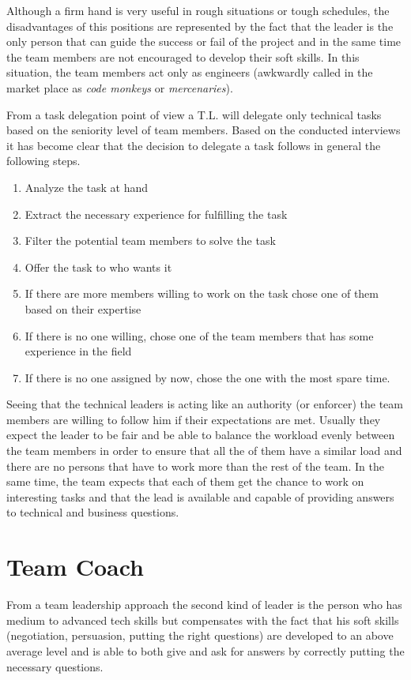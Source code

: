 Although a firm hand is very useful in rough situations or tough schedules, the disadvantages of this positions are represented by the fact that the leader is the only person that can guide the success or fail of the project and in the same time the team members are not encouraged to develop their soft skills. In this situation, the team members act only as engineers (awkwardly called in the market place as \textit{code monkeys} or \textit{mercenaries}).

From a task delegation point of view a T.L. will delegate only technical tasks based on the seniority level of team members. Based on the conducted interviews it has become clear that the decision to delegate a task follows in general the following steps.
\begin{enumerate}
\item Analyze the task at hand
\item Extract the necessary experience for fulfilling the task
\item Filter the potential team members to solve the task
\item Offer the task to who wants it
\item If there are more members willing to work on the task chose one of them based on their expertise
\item If there is no one willing, chose one of the team members that has some experience in the field
\item If there is no one assigned by now, chose the one with the most spare time.
\end{enumerate}

Seeing that the technical leaders is acting like an authority (or enforcer) the team members are willing to follow him if their expectations are met. Usually they expect the leader to be fair and be able to balance the workload evenly between the team members in order to ensure that all the of them have a similar load and there are no persons that have to work more than the rest of the team. In the same time, the team expects that each of them get the chance to work on interesting tasks and that the lead is available and capable of providing answers to technical and business questions.

\section{Team Coach}
\label{sec:team-coach}
From a team leadership approach the second kind of leader is the person who has medium to advanced tech skills but compensates with the fact that his soft skills (negotiation, persuasion, putting the right questions) are developed to an above average level and  is able to both give and ask for answers by correctly putting the necessary questions.

